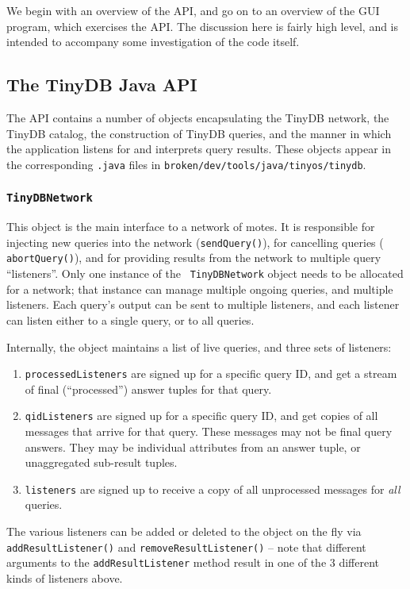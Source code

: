 \documentclass[11pt]{article}
\newcommand{\java}{broken/dev/tools/java}
\begin{document}
We begin with an overview of the API, and go on to an
overview of the GUI program, which exercises the
API.  The discussion here is fairly high level, and is
intended to accompany some investigation of the code itself.

\subsection{The TinyDB Java API}
The API contains a number of objects encapsulating the
TinyDB network, the TinyDB catalog, the construction of TinyDB
queries, and the manner in which the application listens for and
interprets query results.  These objects appear in the corresponding
{\tt .java} files in {\tt \java/tinyos/tinydb}.

\subsubsection{\tt TinyDBNetwork} 
\label{sec:tinydbnet}
This object is the main interface to a
  network of motes.  It is responsible for injecting new queries into
  the network ({\tt sendQuery()}), for cancelling queries ({\tt
  abortQuery()}), and for providing results from the network to
  multiple query ``listeners''.  Only one instance of the {\tt
  TinyDBNetwork} object needs to be allocated for a network; that
  instance can manage multiple ongoing queries, and multiple
  listeners.  Each query's output can be sent to multiple listeners,
  and each listener can listen either to a single query, or to all
  queries.
  
  Internally, the object maintains a list of live queries, and three
  sets of listeners:
  \begin{enumerate}
	\item {\tt processedListeners} are signed up for a specific query
    ID, and get a stream of final (``processed'') answer tuples for
    that query.
	\item {\tt qidListeners} are signed up for a specific query ID,
    and get copies of all messages that arrive for that query.  These
    messages may not be final query answers.  They may be individual
    attributes from an answer tuple, or unaggregated sub-result
    tuples.
	\item  {\tt listeners} are signed up to receive a copy of all
    unprocessed messages for {\em all} queries.  
  \end{enumerate}
  The various listeners can be added or deleted to the object on the
  fly via {\tt addResultListener()} and {\tt removeResultListener()}
  -- note that different arguments to the {\tt addResultListener}
  method result in one of the 3 different kinds of listeners above.
\end{document}
